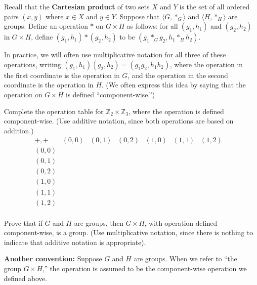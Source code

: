 \begin{definition}
Recall that the \textbf{Cartesian product} of two sets \(X\) and \(Y\) is the set of all ordered pairs \((x,y)\) where \(x\in X\) and \(y \in Y\). Suppose that \(\langle G, *_{G} \rangle \) and \(\langle H, *_{H} \rangle \) are groups. Define an operation \(*\) on \(G \times H\) as follows: for all \((g_1 , h_1)\) and \((g_2, h_2)\) in \(G \times H\), define \((g_1, h_1)*(g_2 , h_2 )\) to be \((g_1 *_{G} g_2, h_1 *_{H} h_2) \).
\end{definition}

In practice, we will often use multiplicative notation for all three of these operations, writing \((g_1, h_1)(g_2 , h_2 ) = (g_1 g_2, h_1h_2 )\), where the operation in the first coordinate is the operation in \(G\), and the operation in the second coordinate is the operation in \(H\). (We often express this idea by saying that the operation on \(G\times H\) is defined ``component-wise.'')

\begin{problem}
Complete the operation table for \(\mathbb{Z}_2 \times \mathbb{Z}_3\), where the operation is defined component-wise. (Use additive notation, since both operations are based on addition.)
\[
\begin{array}{c|c|c|c|c|c|c}
+,+    & (0,0) & (0,1) & (0,2) & (1,0) & (1,1) & (1,2)  \\ \hline
(0,0) &       &       &       &       &       &        \\ \hline
(0,1) &       &       &       &       &       &        \\ \hline
(0,2) &       &       &       &       &       &        \\ \hline
(1,0) &       &       &       &       &       &        \\ \hline
(1,1) &       &       &       &       &       &        \\ \hline
(1,2) &       &       &       &       &       &        \\
\end{array}
\]
\end{problem}

\begin{problem}
Prove that if \(G\) and \(H\) are groups, then \(G \times H\), with operation defined component-wise, is a group. (Use multiplicative notation, since there is nothing to indicate that additive notation is appropriate).
\end{problem}

\textbf{Another convention:} Suppose \(G\) and \(H\) are groups. When we refer to ``the group \(G \times H\),'' the operation is assumed to be the component-wise operation we defined above.


